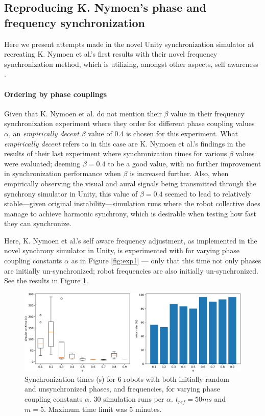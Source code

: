 		\subsection{Reproducing K. Nymoen's phase and frequency synchronization}
			Here we present attempts made in the novel Unity synchronization simulator at recreating K. Nymoen et al.'s first results with their novel frequency synchronization method, which is utilizing, amongst other aspects, self awareness \cite{nymoen_synch}.
			
			\paragraph{Ordering by phase couplings}
			Given that K. Nymoen et al. do not mention their $\beta$ value in their frequency synchronization experiment where they order for different phase coupling values $\alpha$, an \textit{empirically decent} $\beta$ value of 0.4 is chosen for this experiment. What \textit{empirically decent} refers to in this case are K. Nymoen et al.'s findings in the results of their last experiment \cite{nymoen_synch} where synchronization times for various $\beta$ values were evaluated; deeming $\beta=0.4$ to be a good value, with no further improvement in synchronization performance when $\beta$ is increased further. Also, when empirically observing the visual and aural signals being transmitted through the synchrony simulator in Unity, this value of $\beta=0.4$ seemed to lead to relatively stable—given original instability—simulation runs where the robot collective does manage to achieve harmonic synchrony, which is desirable when testing how fast they can synchronize.
			
			Here, K. Nymoen et al.'s self aware frequency adjustment, as implemented in the novel synchrony simulator in Unity, is experimented with for varying phase coupling constants $\alpha$ as in Figure \ref{fig:exp1} — only that this time not only phases are initially un-synchronized; robot frequencies are also initially un-synchronized. See the results in Figure \ref{fig:exp2}.
			
			\begin{figure}[ht!]
				\centering
				\includegraphics[width=\linewidth]{Assets/DocSegments/Chapters/ExperimentsAndResults/Figures/PerfScores/experiment2_perfScores.pdf}
				\caption{Synchronization times (s) for 6 robots with both initially random and unsynchronized phases, and frequencies, for varying phase coupling constants $\alpha$. 30 simulation runs per $\alpha$. $t_{ref}=50ms$ and $m=5$. Maximum time limit was 5 minutes.}
				\label{fig:exp2}
			\end{figure}
			
